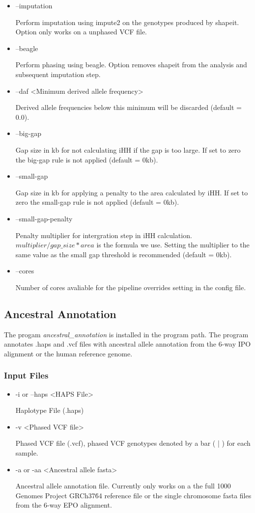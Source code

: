 \documentclass[a4paper,10pt]{article}
\begin{document}
\begin{itemize}
\item --imputation

Perform imputation using impute2 on the genotypes produced by shapeit. Option only works on a unphased VCF file.

\item --beagle

Perform phasing using beagle. Option removes shapeit from the analysis and subsequent imputation step.

\item --daf <Minimum derived allele frequency>

Derived allele frequencies below this minimum will be discarded (default = 0.0).

\item --big-gap

Gap size in kb for not calculating iHH if the gap is too large. If set
to zero the big-gap rule is not applied (default = 0kb).

\item --small-gap

Gap size in kb for applying a penalty to the area calculated by
iHH. If set to zero the small-gap rule is not applied (default = 0kb).

\item --small-gap-penalty

Penalty multiplier for intergration step in iHH
calculation. $multiplier/gap\_size * area$ is the formula we
use. Setting the multiplier to the same value as the small gap
threshold is recommended (default = 0kb).

\item --cores 

Number of cores avaliable for the pipeline overrides setting in the config file. 

\end{itemize}
\subsection{Ancestral Annotation}
The progam \emph{ancestral\_annotation} is installed in the program
path. The program annotates .haps and .vcf files with ancestral allele
annotation from the 6-way IPO alignment or the human reference genome.
\subsubsection{Input Files}
\begin{itemize}
\item -i or --haps <HAPS File>

Haplotype File (.haps)

\item -v <Phased VCF file>

Phased VCF file (.vcf), phased VCF genotypes denoted by a bar ( | ) for each sample.
\item -a or -aa <Ancestral allele fasta>

Ancestral allele annotation file. Currently only works on a the full
1000 Genomes Project GRCh37\.64 reference file or the single chromosome fasta
files from the 6-way EPO alignment.

\end{itemize}
\end{document}
